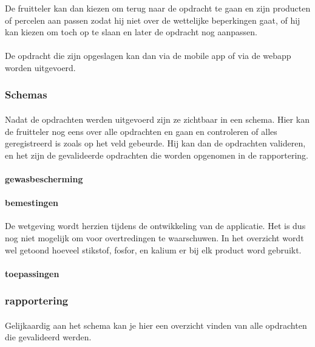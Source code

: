 De fruitteler kan dan kiezen om terug naar de opdracht te gaan en zijn producten of percelen
aan passen zodat hij niet over de wettelijke beperkingen gaat, of hij kan kiezen om toch
op te slaan en later de opdracht nog aanpassen.

\paragraph {} De opdracht die zijn opgeslagen kan dan via de mobile app of via de webapp
worden uitgevoerd.


\subsubsection {Schemas}

\paragraph {} Nadat de opdrachten werden uitgevoerd zijn ze zichtbaar in een schema. Hier
kan de fruitteler nog eens over alle opdrachten en gaan en controleren of alles
geregistreerd is zoals op het veld gebeurde. Hij kan dan de opdrachten valideren, en het
zijn de gevalideerde opdrachten die worden opgenomen in de rapportering.

\paragraph {gewasbescherming}

\paragraph {bemestingen} De wetgeving wordt herzien tijdens de ontwikkeling van de
applicatie. Het is dus nog niet mogelijk om voor overtredingen te waarschuwen. In het
overzicht wordt wel getoond hoeveel stikstof, fosfor, en kalium er bij elk product word
gebruikt.

\paragraph {toepassingen}


\subsubsection {rapportering}\label{rapportering}

\paragraph {} Gelijkaardig aan het schema kan je hier een overzicht vinden van alle
opdrachten die gevalideerd werden.

